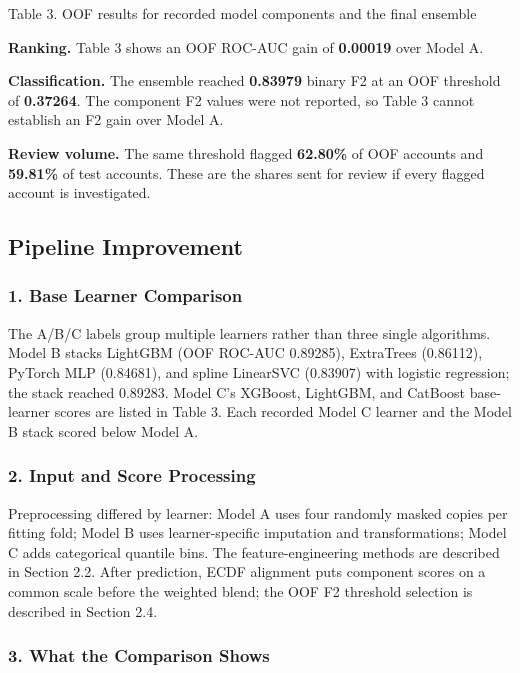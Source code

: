 \documentclass[11pt,a4paper]{article}
\begin{document}
{\centering\small Table 3. OOF results for recorded model components and the final ensemble\par}\medskip

\textbf{Ranking.} Table 3 shows an OOF ROC-AUC gain of \textbf{0.00019} over Model A.

\textbf{Classification.} The ensemble reached \textbf{0.83979} binary F2 at an OOF threshold of \textbf{0.37264}. The component F2 values were not reported, so Table 3 cannot establish an F2 gain over Model A.

\textbf{Review volume.} The same threshold flagged \textbf{62.80\%} of OOF accounts and \textbf{59.81\%} of test accounts. These are the shares sent for review if every flagged account is investigated.

\subsection{Pipeline Improvement}

\subsubsection*{1. Base Learner Comparison}

The A/B/C labels group multiple learners rather than three single algorithms. Model B stacks LightGBM (OOF ROC-AUC 0.89285), ExtraTrees (0.86112), PyTorch MLP (0.84681), and spline LinearSVC (0.83907) with logistic regression; the stack reached 0.89283. Model C's XGBoost, LightGBM, and CatBoost base-learner scores are listed in Table 3. Each recorded Model C learner and the Model B stack scored below Model A.

\subsubsection*{2. Input and Score Processing}

Preprocessing differed by learner: Model A uses four randomly masked copies per fitting fold; Model B uses learner-specific imputation and transformations; Model C adds categorical quantile bins. The feature-engineering methods are described in Section 2.2. After prediction, ECDF alignment puts component scores on a common scale before the weighted blend; the OOF F2 threshold selection is described in Section 2.4.

\subsubsection*{3. What the Comparison Shows}
\end{document}
